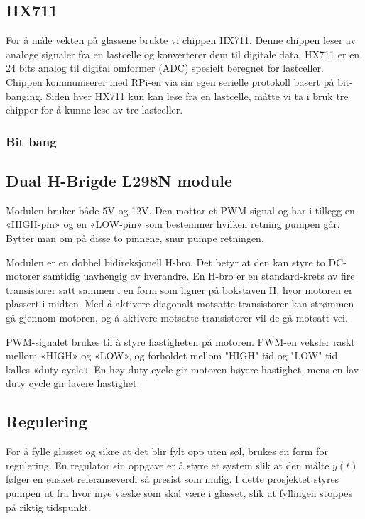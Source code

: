 \subsection{HX711}
For å måle vekten på glassene brukte vi chippen HX711. Denne chippen leser av analoge signaler fra en lastcelle og konverterer dem til digitale data. HX711 er en 24 bits analog til digital omformer (ADC) spesielt beregnet for lastceller. Chippen kommuniserer med RPi-en via sin egen serielle protokoll basert på bit-banging. Siden hver HX711 kun kan lese fra en lastcelle, måtte vi ta i bruk tre chipper for å kunne lese av tre lastceller.

\subsubsection{Bit bang}

\subsection{Dual H-Brigde L298N module}
Modulen bruker både 5V og 12V. Den mottar et PWM-signal og har i tillegg en «HIGH-pin» og en «LOW-pin» som bestemmer hvilken retning pumpen går. Bytter man om på disse to pinnene, snur pumpe retningen.

Modulen er en dobbel bidireksjonell H-bro. Det betyr at den kan styre to DC-motorer samtidig uavhengig av hverandre. En H-bro er en standard-krets av fire transistorer satt sammen i en form som ligner på bokstaven H, hvor motoren er plassert i midten. Med å aktivere diagonalt motsatte transistorer kan strømmen gå gjennom motoren, og å aktivere motsatte transistorer vil de gå motsatt vei.

PWM-signalet brukes til å styre hastigheten på motoren. PWM-en veksler raskt mellom «HIGH» og «LOW», og forholdet mellom "HIGH" tid og "LOW" tid kalles «duty cycle». En høy duty cycle gir motoren høyere hastighet, mens en lav duty cycle gir lavere hastighet.

\subsection{Regulering}
For å fylle glasset og sikre at det blir fylt opp uten søl, brukes en form for regulering. En regulator sin oppgave er å styre et system slik at den målte $y(t)$ følger en ønsket referanseverdi så presist som mulig. I dette prosjektet styres pumpen ut fra hvor mye væske som skal være i glasset, slik at fyllingen stoppes på riktig tidspunkt.

